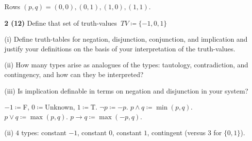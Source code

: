 \documentclass[11pt]{article}
\begin{document}
\vspace{6pt}
Rows $(p,q)=(0,0),(0,1),(1,0),(1,1)$.

\newpage
\thispagestyle{worksheet}

\vspace{4pt}

\vspace{14pt}

\vspace{14pt}

\newpage
\thispagestyle{worksheet}

\vspace{4pt}

\newpage
{}
\noindent\textbf{2 (12)} \quad Define that set of truth-values $\ TV\coloneqq\{-1,0,1\}$

(i) Define truth-tables for negation, disjunction, conjunction, and implication and justify your definitions on the basis of your interpretation of the truth-values.

(ii) How many types arise as analogues of the types: tautology, contradiction, and contingency, and how can they be interpreted?

(iii) Is implication definable in terms on negation and disjunction in your system?

\vspace{8pt}
$-1\coloneqq$F, $0\coloneqq$Unknown, $1\coloneqq$T. \quad $\neg p\coloneqq-p$. \quad $p\wedge q\coloneqq\min(p,q)$. \quad $p\vee q\coloneqq\max(p,q)$. \quad $p\rightarrow q\coloneqq\max(-p,q)$.


(ii) \quad $\boxed{4}$ types: constant $-1$, constant $0$, constant $1$, contingent (versus $3$ for $\{0,1\}$).
\end{document}
